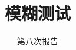 \documentclass{beamer}
\title{模糊测试}
\subtitle{第八次报告}
\begin{document}
	\frame{\titlepage}
\end{document}
